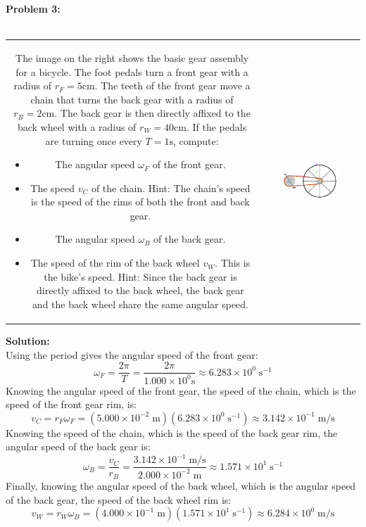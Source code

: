 \documentclass{article}
\newcommand{\dr}[1]{\textcolor{dark_red}{#1}}
\begin{document}
\begin{framed}
\textbf{Problem 3:} ~~\\ ~~\\
\begin{tabular}{cc}
\parbox{0.4\textwidth}{
The image on the right shows the basic gear assembly for a bicycle. The foot pedals turn a front gear with a radius of \(r_F = 5\text{cm}\). The teeth of the front gear move a chain that turns the back gear with a radius of \(r_B = 2\text{cm}\). The back gear is then directly affixed to the back wheel with a radius of \(r_W = 40\text{cm}\). If the pedals are turning once every \(T = 1\text{s}\), compute:
\begin{itemize}
\item The angular speed \(\omega_F\) of the front gear.
\item The speed \(v_C\) of the chain. Hint: The chain's speed is the speed of the rims of both the front and back gear.
\item The angular speed \(\omega_B\) of the back gear.
\item The speed of the rim of the back wheel \(v_W\). This is the bike's speed. Hint: Since the back gear is directly affixed to the back wheel, the back gear and the back wheel share the same angular speed.
\end{itemize} 
} & \parbox{0.6\textwidth}{
\includegraphics[width = 0.6\textwidth]{bicycle_gears}
}
\end{tabular}
\dr{\textbf{Solution:} \\
Using the period gives the angular speed of the front gear: 
\[\omega_F = \frac{2\pi}{T} = \frac{2\pi}{1.000 \times 10^0\text{s}} \approx 6.283 \times 10^0 \;\text{s}^{-1}\] %
Knowing the angular speed of the front gear, the speed of the chain, which is the speed of the front gear rim, is: 
\[v_C = r_F\omega_F = (5.000 \times 10^{-2} \;\text{m})(6.283 \times 10^0 \;\text{s}^{-1}) \approx 3.142 \times 10^{-1}\;\text{m/s}\] %
Knowing the speed of the chain, which is the speed of the back gear rim, the angular speed of the back gear is:
\[\omega_B = \frac{v_C}{r_B} = \frac{3.142 \times 10^{-1} \;\text{m/s}}{2.000 \times 10^{-2} \;\text{m}} \approx 1.571 \times 10^1 \;\text{s}^{-1}\] %
Finally, knowing the angular speed of the back wheel, which is the angular speed of the back gear, the speed of the back wheel rim is:
\[v_W = r_W\omega_B = (4.000 \times 10^{-1} \;\text{m})(1.571 \times 10^1 \;\text{s}^{-1}) \approx 6.284 \times 10^0 \;\text{m/s}\] %
}
\end{framed}
\end{document}
